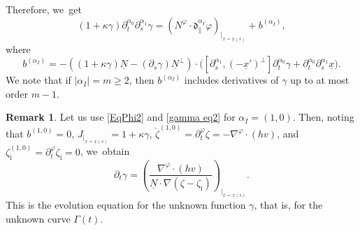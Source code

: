 \documentclass[11pt]{article}
\newcommand{\dpar}{{\mathfrak d}_{\parallel}}
\newcommand{\dt}{\partial_t}
\newcommand{\ul}[1]{\underline{#1}}
\newcommand{\itGamma}{\mathit{\Gamma}}
\theoremstyle{definition}
\newtheorem{remark}[theorem]{Remark}
\begin{document}
Therefore, we~get
\begin{equation}\label{gamma eq2}
(1+\kappa\gamma)\dt^{\alpha_0}\partial_s^{\alpha_1}\gamma
=(N^\varphi\cdot\dpar^{\alpha_I}\varphi)_{\vert_{x=\ul{x}(s)}} + b^{(\alpha_I)},
\end{equation}
where
\[
b^{(\alpha_I)} = -((1+\kappa\gamma)\ul{N} - (\partial_s\gamma)\ul{N}^\perp)\cdot
\bigl([\partial_s^{\alpha_1},(-\ul{x}')^\perp]\dt^{\alpha_0}\gamma + \dt^{\alpha_0}\partial_s^{\alpha_1}\ul{x} \bigr).
\]
We note that if $|\alpha_I|=m\geq2$, then $b^{(\alpha_I)}$ includes derivatives of $\gamma$ up to at most order $m-1$.

\begin{remark}\label{re:EEg}
Let us use \eqref{EqPhi2} and \eqref{gamma eq2} for $\alpha_I\!=\!(1,0)$.
Then, noting that $b^{(1,0)}\!=\!0$, $J_{\vert_{x=\ul{x}(s)}}=1+\kappa\gamma$, $\check{\zeta}^{(1,0)}=\dt^\varphi\zeta=-\nabla^\varphi\cdot(hv)$, and
$\zeta_\mathrm{i}^{(1,0)}=\dt^\varphi\zeta_\mathrm{i}=0$, we~obtain
\[
\dt\gamma = \left(\frac{\nabla^\varphi\cdot(hv)}{\ul{N}\cdot\nabla(\zeta-\zeta_\mathrm{i})} \right)_{\vert_{x=\ul{x}(s)}}.
\]
This is the evolution equation for the unknown function $\gamma$, that is, for the unknown curve $\itGamma(t)$.
\end{remark}
\end{document}
